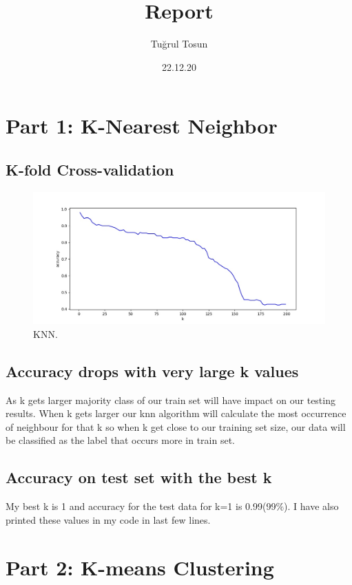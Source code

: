 \documentclass{article}
\title{Report}
\author{Tuğrul Tosun}
\date{22.12.20}
\begin{document}
\maketitle
\section{Part 1: K-Nearest Neighbor}
\subsection{K-fold Cross-validation}
\begin{figure}[h!]
  \includegraphics[width=\linewidth]{knn.jpeg}
  \caption{KNN.}
  \label{fig:KNN}
\end{figure}



\subsection{Accuracy drops with very large k values}
As k gets larger majority class of our train set will have impact on our testing results. When k gets larger our knn algorithm will calculate the most occurrence of neighbour for that k so when k get close to our training set size, our data will be classified as the label that occurs more in train set.

\subsection{Accuracy on test set with the best k}
My best k is 1 and accuracy for the test data for k=1 is 0.99(99$\%$). I have also printed these values in my code in last few lines.\\


\maketitle
\section{Part 2: K-means Clustering}
\end{document}
